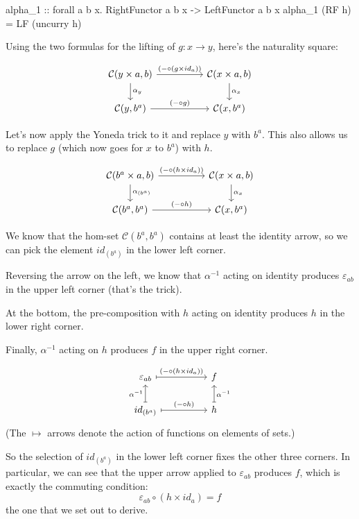 \documentclass[DaoFP]{subfiles}
\begin{document}
\begin{haskell}
alpha_1 :: forall a b x. RightFunctor a b x -> LeftFunctor a b x
alpha_1 (RF h) = LF (uncurry h)
\end{haskell}

Using the two formulas for the lifting of $g \colon x \to y$, here's the naturality square:

\[
 \begin{tikzcd}
 \mathcal{C}(y \times a, b)
 \arrow[rr, "(- \circ (g \times id_a))"]
 \arrow[d,  "\alpha_y"]
& &
\mathcal{C}(x \times a, b)
  \arrow[d, "\alpha_x"]
 \\
 \mathcal{C}(y, b^a)
 \arrow[rr, "(- \circ g)"]
& &
\mathcal{C}(x, b^a)
 \end{tikzcd}
\]

Let's now apply the Yoneda trick to it and replace $y$ with $b^a$. This also allows us to replace $g$ (which now goes for $x$ to $b^a$) with $h$. 

\[
 \begin{tikzcd}
 \mathcal{C}(b^a \times a, b)
 \arrow[rr, "(- \circ (h \times id_a))"]
 \arrow[d,  "\alpha_{(b^a)}"]
& &
\mathcal{C}(x \times a, b)
  \arrow[d,  "\alpha_x"]
 \\
 \mathcal{C}(b^a, b^a)
 \arrow[rr, "(- \circ h)"]
& &
\mathcal{C}(x, b^a)
 \end{tikzcd}
\]

We know that the hom-set $\mathcal{C}(b^a, b^a)$ contains at least the identity arrow, so we can pick the element $id_{(b^a)}$ in the lower left corner. 

Reversing the arrow on the left, we know that $\alpha^{-1}$ acting on identity produces $\varepsilon_{a b}$ in the upper left corner (that's the  trick). 

At the bottom, the pre-composition with $h$ acting on identity produces $h$ in the lower right corner. 

Finally, $\alpha^{-1}$ acting on $h$ produces $f$ in the upper right corner. 

\[
 \begin{tikzcd}[
  every arrow/.style={draw,mapsto}
]
 \varepsilon_{a b}
 \arrow[rr, "(- \circ (h \times id_a))"]
& &
f
 \\
 id_{(b^a)}
 \arrow[u, "\alpha^{-1}"]
 \arrow[rr, "(- \circ h)"]
& &
h
\arrow[u, "\alpha^{-1}"']
 \end{tikzcd}
\]
(The $\mapsto$ arrows denote the action of functions on elements of sets.)


So the selection of $id_{(b^a)}$ in the lower left corner fixes the other three corners. In particular, we can see that the upper arrow applied to $\varepsilon_{a b}$ produces $f$, which is exactly the commuting condition:
\[ \varepsilon_{a b} \circ (h \times id_a) = f \]
the one that we set out to derive.
\end{document}
